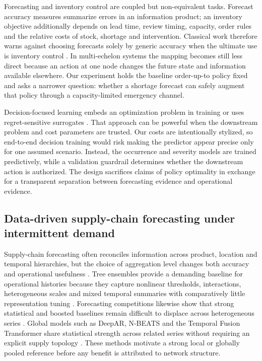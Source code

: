 \documentclass[11pt,a4paper]{article}
\begin{document}
Forecasting and inventory control are coupled but non-equivalent tasks. Forecast accuracy measures summarize errors in an information product; an inventory objective additionally depends on lead time, review timing, capacity, order rules and the relative costs of stock, shortage and intervention. Classical work therefore warns against choosing forecasts solely by generic accuracy when the ultimate use is inventory control \cite{gardner,kolassa}. In multi-echelon systems the mapping becomes still less direct because an action at one node changes the future state and information available elsewhere. Our experiment holds the baseline order-up-to policy fixed and asks a narrower question: whether a shortage forecast can safely augment that policy through a capacity-limited emergency channel.

Decision-focused learning embeds an optimization problem in training or uses regret-sensitive surrogates \cite{spo,trees,mandi}. That approach can be powerful when the downstream problem and cost parameters are trusted. Our costs are intentionally stylized, so end-to-end decision training would risk making the predictor appear precise only for one assumed scenario. Instead, the occurrence and severity models are trained predictively, while a validation guardrail determines whether the downstream action is authorized. The design sacrifices claims of policy optimality in exchange for a transparent separation between forecasting evidence and operational evidence.

\subsection{Data-driven supply-chain forecasting under intermittent demand}
Supply-chain forecasting often reconciles information across product, location and temporal hierarchies, but the choice of aggregation level changes both accuracy and operational usefulness \cite{babai}. Tree ensembles provide a demanding baseline for operational histories because they capture nonlinear thresholds, interactions, heterogeneous scales and mixed temporal summaries with comparatively little representation tuning \cite{xgb}. Forecasting competitions likewise show that strong statistical and boosted baselines remain difficult to displace across heterogeneous series \cite{m4,m5}. Global models such as DeepAR, N-BEATS and the Temporal Fusion Transformer share statistical strength across related series without requiring an explicit supply topology \cite{deepar,nbeats,tft}. These methods motivate a strong local or globally pooled reference before any benefit is attributed to network structure.
\end{document}
